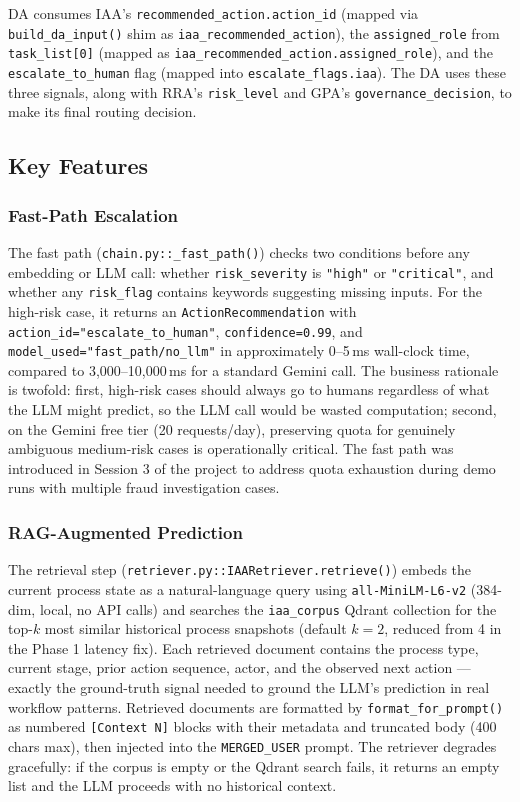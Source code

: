 \documentclass[12pt,a4paper]{article}
\begin{document}
DA consumes IAA's \texttt{recommended\_action.action\_id} (mapped via
\texttt{build\_da\_input()} shim as \texttt{iaa\_recommended\_action}),
the \texttt{assigned\_role} from \texttt{task\_list[0]} (mapped as
\texttt{iaa\_recommended\_action.assigned\_role}), and the \texttt{escalate\_to\_human}
flag (mapped into \texttt{escalate\_flags.iaa}). The DA uses these three signals,
along with RRA's \texttt{risk\_level} and GPA's \texttt{governance\_decision}, to
make its final routing decision.

\subsection{Key Features}

\subsubsection{Fast-Path Escalation}

The fast path (\texttt{chain.py::\_fast\_path()}) checks two conditions before any
embedding or LLM call: whether \texttt{risk\_severity} is \texttt{"high"} or
\texttt{"critical"}, and whether any \texttt{risk\_flag} contains keywords suggesting
missing inputs. For the high-risk case, it returns an \texttt{ActionRecommendation}
with \texttt{action\_id="escalate\_to\_human"}, \texttt{confidence=0.99}, and
\texttt{model\_used="fast\_path/no\_llm"} in approximately 0--5\,ms wall-clock time,
compared to 3,000--10,000\,ms for a standard Gemini call. The business rationale is
twofold: first, high-risk cases should always go to humans regardless of what the
LLM might predict, so the LLM call would be wasted computation; second, on the Gemini
free tier (20 requests/day), preserving quota for genuinely ambiguous medium-risk
cases is operationally critical. The fast path was introduced in Session 3 of the
project to address quota exhaustion during demo runs with multiple fraud investigation
cases.

\subsubsection{RAG-Augmented Prediction}

The retrieval step (\texttt{retriever.py::IAARetriever.retrieve()}) embeds the current
process state as a natural-language query using \texttt{all-MiniLM-L6-v2} (384-dim,
local, no API calls) and searches the \texttt{iaa\_corpus} Qdrant collection for the
top-$k$ most similar historical process snapshots (default $k=2$, reduced from 4 in
the Phase 1 latency fix). Each retrieved document contains the process type, current
stage, prior action sequence, actor, and the observed next action --- exactly the
ground-truth signal needed to ground the LLM's prediction in real workflow patterns.
Retrieved documents are formatted by \texttt{format\_for\_prompt()} as numbered
\texttt{[Context N]} blocks with their metadata and truncated body (400 chars max),
then injected into the \texttt{MERGED\_USER} prompt. The retriever degrades gracefully:
if the corpus is empty or the Qdrant search fails, it returns an empty list and
the LLM proceeds with no historical context.
\end{document}
